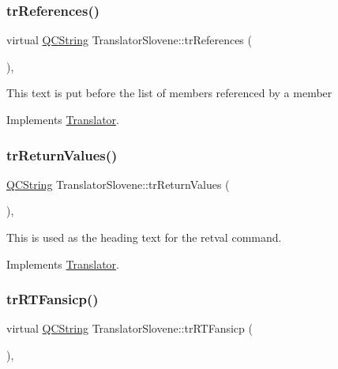 \subsubsection{\texorpdfstring{trReferences()}{trReferences()}}
{\footnotesize\ttfamily virtual \mbox{\hyperlink{class_q_c_string}{Q\+C\+String}} Translator\+Slovene\+::tr\+References (\begin{DoxyParamCaption}{ }\end{DoxyParamCaption})\hspace{0.3cm}{\ttfamily [inline]}, {\ttfamily [virtual]}}

This text is put before the list of members referenced by a member 

Implements \mbox{\hyperlink{class_translator}{Translator}}.

\mbox{\label{class_translator_slovene_a23840e57d61b02871f444926553c4a6f}} 
\subsubsection{\texorpdfstring{trReturnValues()}{trReturnValues()}}
{\footnotesize\ttfamily \mbox{\hyperlink{class_q_c_string}{Q\+C\+String}} Translator\+Slovene\+::tr\+Return\+Values (\begin{DoxyParamCaption}{ }\end{DoxyParamCaption})\hspace{0.3cm}{\ttfamily [inline]}, {\ttfamily [virtual]}}

This is used as the heading text for the retval command. 

Implements \mbox{\hyperlink{class_translator}{Translator}}.

\mbox{\label{class_translator_slovene_a381c8c7ad7fe0ea5379e1ed062ba0905}} 
\subsubsection{\texorpdfstring{trRTFansicp()}{trRTFansicp()}}
{\footnotesize\ttfamily virtual \mbox{\hyperlink{class_q_c_string}{Q\+C\+String}} Translator\+Slovene\+::tr\+R\+T\+Fansicp (\begin{DoxyParamCaption}{ }\end{DoxyParamCaption})\hspace{0.3cm}{\ttfamily [inline]}, {\ttfamily [virtual]}}


